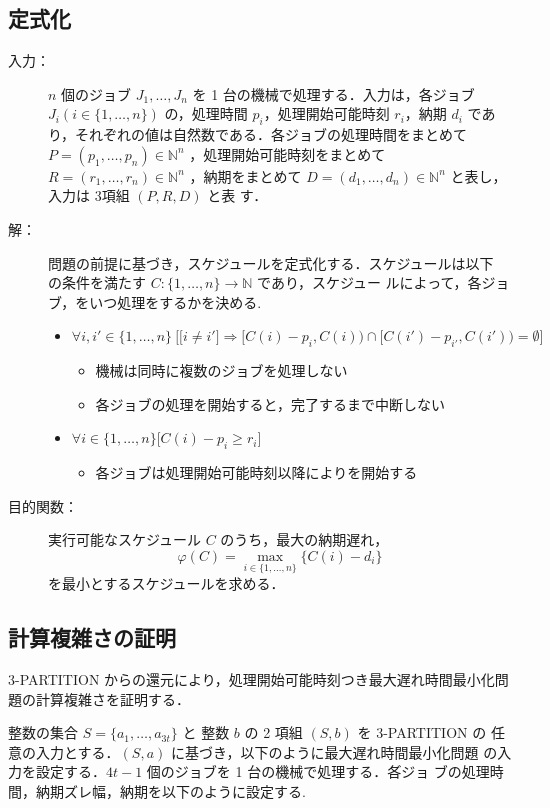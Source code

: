 \documentclass[12pt]{optlab-bachelor}
\begin{document}
\subsection{定式化}
\begin{description}
  \item[入力：] $n$ 個のジョブ $J_1,\ldots,J_n$ を 1 台の機械で処理する．入力は，各ジョブ $J_i ( i \in \{1,\ldots,n\} )$ の，処理時間 $p_i$，処理開始可能時刻
  $r_i$，納期 $d_i$ であり，それぞれの値は自然数である．各ジョブの処理時間をまとめて $P =
  (p_1,\ldots,p_n) \in \mathbb{N}^n$ ，処理開始可能時刻をまとめて $R =
  (r_1,\ldots,r_n) \in \mathbb{N}^n$ ，納期をまとめて $D =
  (d_1,\ldots,d_n) \in \mathbb{N}^n$ と表し，入力は 3項組 $(P,R,D)$ と表
  す．
  \item[解：] 問題の前提に基づき，スケジュールを定式化する．スケジュールは以下
  の条件を満たす $C : \{1,\ldots,n\} \to \mathbb{N}$ であり，スケジュー
  ルによって，各ジョブ，をいつ処理をするかを決める.
  \begin{itemize}
    \item $\forall i, i' \in \{1,\ldots,n\}\ \Big[ \big[i \neq i' \big] \Rightarrow [C(i) - p_i, C(i)) \cap [C(i') - p_{i'}, C(i')) = \emptyset \Big]$
    \begin{itemize}
      \item 機械は同時に複数のジョブを処理しない
      \item 各ジョブの処理を開始すると，完了するまで中断しない
    \end{itemize}
    \item  $\forall i \in \{1,\ldots,n\}\big[C(i) - p_i \ge r_i\big]$
    \begin{itemize}
      \item 各ジョブは処理開始可能時刻以降によりを開始する
    \end{itemize}
  \end{itemize}
  \item[目的関数：] 実行可能なスケジュール $C$ のうち，最大の納期遅れ，
  $$\displaystyle \varphi(C) = \max_{i \in \{1,\ldots,n\}}\{C(i) - d_i\}$$
  を最小とするスケジュールを求める．
\end{description}

\subsection{計算複雑さの証明}
\textsc{3-PARTITION} からの還元により，処理開始可能時刻つき最大遅れ時間最小化問題の計算複雑さを証明する．

整数の集合 $S = \{a_1,\ldots,a_{3t}\}$ と 整数 $b$ の 2 項組 $(S,b)$ を \textsc{3-PARTITION} の
任意の入力とする．$(S,a)$ に基づき，以下のように最大遅れ時間最小化問題
の入力を設定する．$4t - 1$ 個のジョブを 1 台の機械で処理する．各゙ジョ
ブの処理時間，納期ズレ幅，納期を以下のように設定する.
\end{document}
